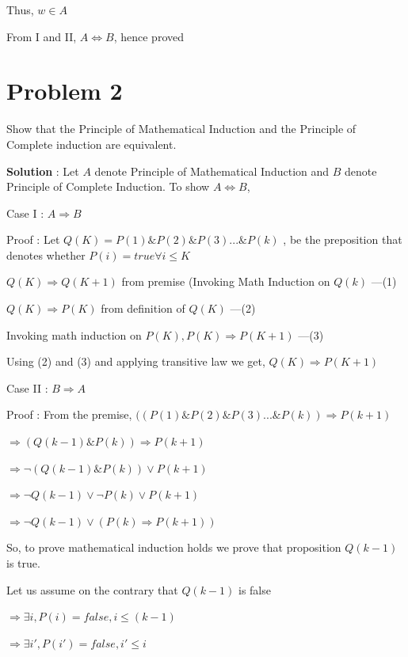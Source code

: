 \documentclass{article}
\begin{document}
    \qquad Thus, $w \in A$
    
    \quad From I and II, $A \iff B$, hence proved
    
    
    \section*{Problem 2} Show that the Principle of Mathematical Induction and the Principle of Complete induction are equivalent.

    \textbf{Solution} : 
    Let $A$ denote Principle of Mathematical Induction and $B$ denote Principle of Complete Induction. To show $A \iff B$,
    
    Case I : $A \Longrightarrow B$
    
    Proof : Let $Q(K) = P(1) \& P(2) \& P(3) ... \& P(k)$ , be the preposition that denotes whether $P(i) = true \forall i \leq K$
    
    \quad $Q(K) \Longrightarrow Q(K + 1)$ from premise (Invoking Math Induction on $Q(k)$ ---(1)
    
    \quad $Q(K) \Longrightarrow P(K)$ from definition of $Q(K)$ ---(2)
    
    \quad Invoking math induction on $P(K),  P(K) \Longrightarrow P(K + 1)$ ---(3)
    
    \quad Using (2) and (3) and applying transitive law we get, $Q(K) \Longrightarrow P(K + 1)$
    
    Case II : $B \Longrightarrow A$
    
    Proof : From the premise, $((P(1) \& P(2) \& P(3) ... \& P(k)) \Longrightarrow P(k + 1)$
    
    \quad $\Longrightarrow (Q(k - 1) \& P(k)) \Longrightarrow P(k + 1)$
    
    \quad $\Longrightarrow \neg (Q(k - 1) \& P(k)) \lor P(k+1)$

    \quad $\Longrightarrow \neg Q(k - 1) \lor \neg P(k) \lor P(k+1)$

    \quad $\Longrightarrow \neg Q(k - 1) \lor (P(k) \Longrightarrow P(k + 1))$
    
    \quad So, to prove mathematical induction holds we prove that proposition $Q(k - 1)$ is true.
    
    \quad Let us assume on the contrary that $Q(k - 1)$ is false
    
    \quad $\Longrightarrow \exists i, P(i) = false, i \leq (k - 1)$
    
    \quad $\Longrightarrow \exists i', P(i') = false, i' \leq i$
    
\end{document}
